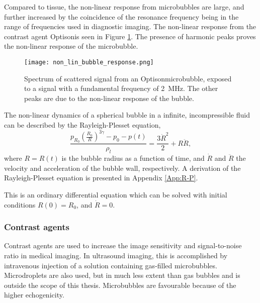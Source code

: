 Compared to tissue, the non-linear response from microbubbles are large, and further increased by the coincidence of the resonance frequency being in the range of frequencies used in diagnostic imaging. The non-linear response from the contrast agent   Optison\texttrademark is seen in Figure \ref{Fig:bub_response}. The presence of harmonic peaks proves the non-linear response of the microbubble. 

\begin{figure}[h]
  \centering
  \label{Fig:bub_response}
  \texttt{[image: non\_lin\_bubble\_response.png]}
  \caption{Spectrum of scattered signal from an Optison\texttrademark microbubble, exposed to a signal with a fundamental frequency of \SI{2}{\mega\hertz}. The other peaks are due to the non-linear response of the bubble\cite{Shi1999}.}
\end{figure}
The non-linear dynamics of a spherical bubble in a infinite, incompressible fluid can be described by the Rayleigh-Plesset equation,
\begin{equation}
\label{r-p}
\frac{p_{R_0}\left(\frac{R_0}{R}\right)^{3\gamma}-p_0 - p(t)}{\rho_l} = \frac{3\dot{R}^2}{2}+R\ddot{R},
\end{equation}
where $R = R(t)$ is the bubble radius as a function of time, and $\dot{R}$ and $\ddot{R}$ the velocity and acceleration of the bubble wall, respectively. A derivation of the Rayleigh-Plesset equation is presented in Appendix \ref{App:R-P}.

This is an ordinary differential equation which can be solved with initial conditions $R(0) = R_0$, and $\dot{R} = 0$\cite{Moss2014}. 

\subsubsection{Contrast agents}
\label{contrast agents}

Contrast agents are used to increase the image sensitivity and signal-to-noise ratio in medical imaging. In ultrasound imaging, this is accomplished by intravenous injection of a solution containing gas-filled microbubbles. Microdroplets are also used\cite{Soman2006}, but in much less extent than gas bubbles and is outside the scope of this thesis. Microbubbles are favourable because of the higher echogenicity\cite{Talu2008}.

